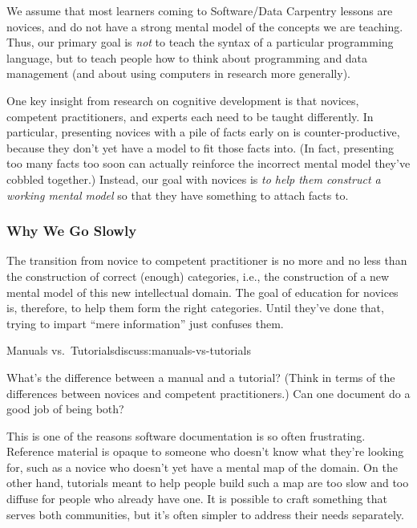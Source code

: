 We assume that most learners coming to Software/Data Carpentry lessons
are novices, and do not have a strong mental model of the concepts we
are teaching. Thus, our primary goal is \emph{not} to teach the syntax
of a particular programming language, but to teach people how to think
about programming and data management (and about using computers in
research more generally).

One key insight from research on cognitive development is that novices,
competent practitioners, and experts each need to be taught differently.
In particular, presenting novices with a pile of facts early on is
counter-productive, because they don't yet have a model to fit those
facts into. (In fact, presenting too many facts too soon can actually
reinforce the incorrect mental model they've cobbled together.) Instead,
our goal with novices is \emph{to help them construct a working mental
model} so that they have something to attach facts to.

\subsubsection{Why We Go Slowly}\label{why-we-go-slowly}

The transition from novice to competent practitioner is no more and no
less than the construction of correct (enough) categories, i.e., the
construction of a new mental model of this new intellectual domain. The
goal of education for novices is, therefore, to help them form the right
categories. Until they've done that, trying to impart ``mere
information'' just confuses them.

\begin{discussion}{Manuals vs.~Tutorials}{discuss:manuals-vs-tutorials}

What's the difference between a manual and a tutorial? (Think in terms
of the differences between novices and competent practitioners.) Can one
document do a good job of being both?
\end{discussion}

This is one of the reasons software documentation is so often
frustrating. Reference material is opaque to someone who doesn't know
what they're looking for, such as a novice who doesn't yet have a mental
map of the domain. On the other hand, tutorials meant to help people
build such a map are too slow and too diffuse for people who already
have one. It is possible to craft something that serves both
communities, but it's often simpler to address their needs separately.

